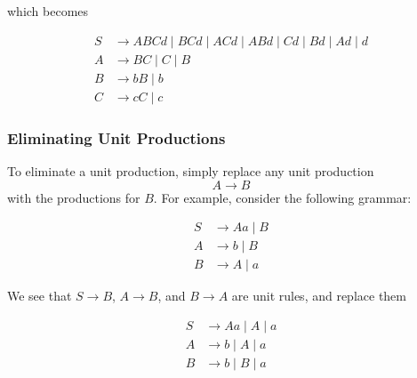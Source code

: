 which becomes 

\begin{align*}
    S &\to ABCd \mid BCd \mid ACd \mid ABd \mid Cd \mid Bd \mid Ad \mid d\\
    A &\to BC \mid C \mid B\\
    B &\to bB \mid b \\
    C &\to cC \mid c
\end{align*}

\subsubsection{Eliminating Unit Productions}\label{subsubsec:eliminating-unit-productions}

To eliminate a unit production, simply replace any unit production \[A\to B\] with the productions for \(B\). For example, consider the following grammar:

\begin{align*}
    S &\to Aa \mid B\\
    A &\to b \mid B\\
    B &\to A \mid a
\end{align*}

We see that \(S\to B\), \(A\to B\), and \(B\to A\) are unit rules, and replace them

\begin{align*}
    S &\to Aa \mid A \mid a\\
    A &\to b \mid A \mid a\\
    B &\to b \mid B \mid a
\end{align*}
